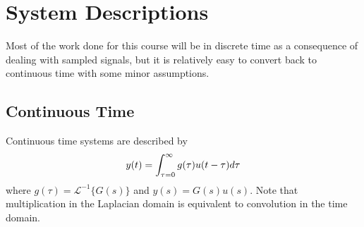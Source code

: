 \documentclass[lecture,12pt,]{pcms-l}
\begin{document}
\mainmatter
\setcounter{page}{1}

\lectureseries[\course]{\course}

\date{October 1, 2009}

\setaddress

\setcounter{lecture}{2}
\setcounter{chapter}{2}


\section{System Descriptions}
Most of the work done for this course will be in discrete time as a consequence of dealing with sampled signals, but it is relatively easy to convert back to continuous time with some minor assumptions.

\subsection{Continuous Time}
Continuous time systems are described by
$$y(t) = \int_{\tau=0}^\infty g(\tau)u(t-\tau)d\tau$$
where $g(\tau)=\mathcal{L}^{-1}\lbrace G(s)\rbrace$ and $y(s)=G(s)u(s)$. Note that multiplication in the Laplacian domain is equivalent to convolution in the time domain.
\end{document}
